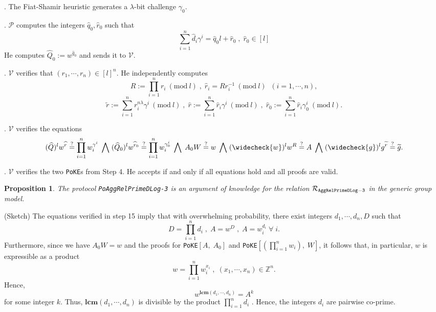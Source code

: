 \documentclass[11pt, lettersize, notitlepage, leqno, footskip=0.6cm]{article}
\newcommand{\bz}{\mathbb Z}
\newcommand{\pl}{\prod\limits}
\newcommand{\slim}{\sum\limits}
\newcommand{\wti}{\widetilde}
\newcommand{\mc}{\mathcal}
\newcommand{\mbf}{\mathbf}
\newcommand{\lam}{\lambda}
\newcommand{\what}{\widehat}
\newcommand{\weck}{\widecheck}
\newcommand{\mP}{\mc{P}}
\newcommand{\V}{\mc{V}}
\newcommand{\vs}{\vspace{-0.15cm}}
\newcommand{\noin}{\noindent}
\newcommand{\op}{overwhelming probability}
\newcommand{\sta}{\stackrel{?}{=}}
\newcommand{\Mod}[1]{\ (\mathrm{mod}\ #1)}
\newcommand{\LCM}{\mbf{lcm}}
\newtheorem{Prop}[Thm]{Proposition}
\numberwithin{equation}{section}
\begin{document}
\begin{prf1}
\noin 12. The Fiat-Shamir heuristic generates a $\lam$-bit challenge $\gamma_0$.

\noin 13. $\mP$ computes the integers $\what{q}_0, \what{r}_0$ such that \vs $$\slim_{i=1}^n \what{d}_i\gamma^i = \what{q}_0l+\what{r}_0\;,\;\what{r}_0\in [l]$$ He computes $\what{Q}_0:= w^{\what{q}_0} $ and sends it to $\V$.

\noin 14. $\V$ verifies that $(r_1,\cdots,r_n)\in [l]^{n}$. He independently computes \vs $$R:= \pl_{i=1}^n r_i\Mod{l} \;,\;\what{r}_i = Rr_i^{-1}\Mod{l}\;\;(i=1,\cdots,n),$$\vs $$\wti{r}:= \slim_{i=1}^n {r}_i^{n\lam}\gamma^i\Mod{l} \;,\; \what{r}:= \slim_{i=1}^n \what{r}_i\gamma^i\Mod{l}\;,\;\what{r}_0:= \slim_{i=1}^n \what{r}_i\gamma_0^i\Mod{l}.$$

\noin 15. $\V$ verifies the equations \vs $$(\what{Q})^lw^{\what{r}}\sta \pl_{i=1}^n w_i^{\gamma^i} \;\bigwedge\; (\what{Q}_0)^lw^{\what{r}_0}\sta \pl_{i=1}^n w_i^{\gamma_0^i}\;\bigwedge\; A_0W\sta w\;\bigwedge\; (\weck{w})^lw^R\sta A\;\bigwedge\; (\weck{g})^lg^{\wti{r}}\sta\wti{g}.$$

\noin 16. $\V$ verifies the two \verb|PoKE|s from Step 4. He accepts if and only if all equations hold and all proofs are valid.\end{prf1}

\vspace{0.1cm}


\begin{Prop} The protocol \verb|PoAggRelPrimeDLog-3| is an argument of knowledge for the relation $\mc{R}_{\tt{AggRelPrimeDLog-3}}$ in the generic group model.\end{Prop}

\begin{prf} (Sketch) The equations verified in step 15 imply that with \op, there exist integers $d_1,\cdots,d_n, D$ such that \vs $$D = \pl_{i=1}^n d_i\;,\;A = w^D\;,\; A= w_i^{d_i}\;\forall \;i .$$ Furthermore, since we have $A_0W = w$ and the proofs for \verb|PoKE|$[A,\;A_0]$ and \verb|PoKE|$[(\pl_{i=1}^n w_i),\; W]$, it follows that, in particular, $w$ is expressible as a product \vs $$w =\pl_{i=1}^n w_i^{x_i}\;,\;(x_1,\cdots,x_n)\in\bz^n.$$ Hence, \vs $$w^{\LCM(d_1,\cdots,d_n)} = A^k$$ for some integer $k$. Thus, $\LCM(d_1,\cdots,d_n)$ is divisible by the product $\pl_{i=1}^n d_i$ . Hence, the integers $d_i$ are pairwise co-prime.\end{prf}



\bigskip
\end{document}

